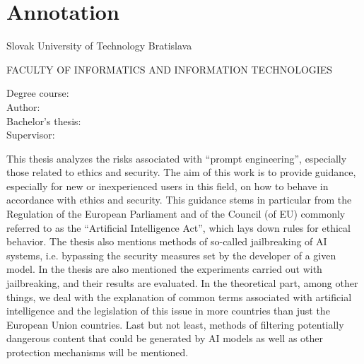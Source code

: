 \thispagestyle{empty}

\section*{Annotation}

\begin{minipage}[t]{1\columnwidth}%
Slovak University of Technology Bratislava

FACULTY OF INFORMATICS AND INFORMATION TECHNOLOGIES

Degree course: \hspace{1.4cm} \myStudyProgramEN\\

\noindent
Author: \hspace{2.6cm} \myName \\
Bachelor's thesis: \hspace{0.9cm} \myTitleEN \\
Supervisor: \hspace{2cm} \mySupervisor \\
\noindent
\myDateEN%
\end{minipage}

\bigskip{}

This thesis analyzes the risks associated with ``prompt engineering'', especially those related to ethics and security. The aim of this work is to provide guidance, especially for new or inexperienced users in this field, on how to behave in accordance with ethics and security. This guidance stems in particular from the Regulation of the European Parliament and of the Council (of EU) commonly referred to as the ``Artificial Intelligence Act'', which lays down rules for ethical behavior. The thesis also mentions methods of so-called jailbreaking of AI systems, i.e. bypassing the security measures set by the developer of a given model. In the thesis are also mentioned the experiments carried out with jailbreaking, and their results are evaluated. In the theoretical part, among other things, we deal with the explanation of common terms associated with artificial intelligence and the legislation of this issue in more countries than just the European Union countries. Last but not least, methods of filtering potentially dangerous content that could be generated by AI models as well as other protection mechanisms will be mentioned.

\newpage{}\thispagestyle{empty}\medskip{}


\newpage{}

\newpage
\thispagestyle{empty}
\mbox{}
\newpage
